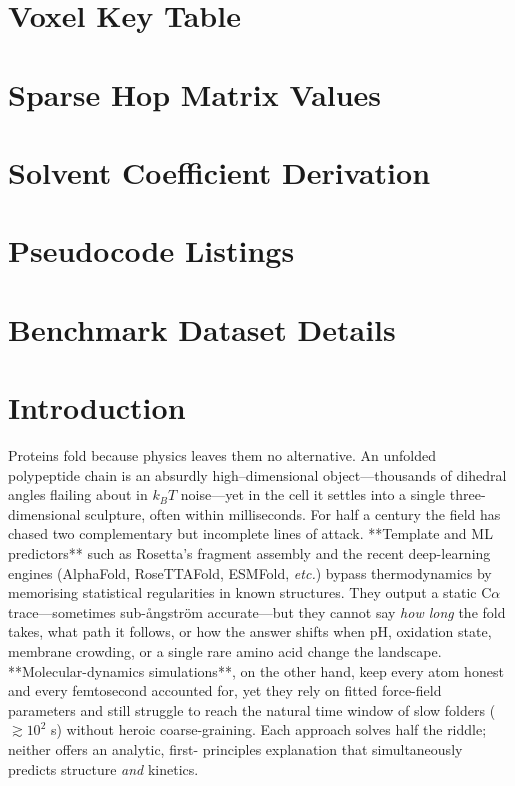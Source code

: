 \documentclass[11pt]{article}
\begin{document}
\appendix
\section{Voxel Key Table}\label{app:voxel-table}
\section{Sparse Hop Matrix Values}\label{app:hop-matrix}
\section{Solvent Coefficient Derivation}\label{app:solvent}
\section{Pseudocode Listings}\label{app:pseudocode}
\section{Benchmark Dataset Details}\label{app:benchmarks}

\section{Introduction}\label{sec:intro}

Proteins fold because physics leaves them no alternative.  An unfolded
polypeptide chain is an absurdly high--dimensional object—thousands of
dihedral angles flailing about in \(k_{B}T\) noise—yet in the cell it
settles into a single three-dimensional sculpture, often within
milliseconds.  For half a century the field has chased two complementary
but incomplete lines of attack.  **Template and ML predictors** such as
Rosetta’s fragment assembly and the recent deep-learning engines
(AlphaFold, RoseTTAFold, ESMFold, \emph{etc.}) bypass thermodynamics by
memorising statistical regularities in known structures.  They output a
static C\(\alpha\) trace—sometimes sub-ångström accurate—but they cannot
say \emph{how long} the fold takes, what path it follows, or how the
answer shifts when pH, oxidation state, membrane crowding, or a single
rare amino acid change the landscape.  **Molecular-dynamics
simulations**, on the other hand, keep every atom honest and every
femtosecond accounted for, yet they rely on fitted force-field
parameters and still struggle to reach the natural time window of slow
folders (\(\gtrsim10^{2}\) s) without heroic coarse-graining.  Each
approach solves half the riddle; neither offers an analytic, first-
principles explanation that simultaneously predicts structure \emph{and}
kinetics.
\end{document}
